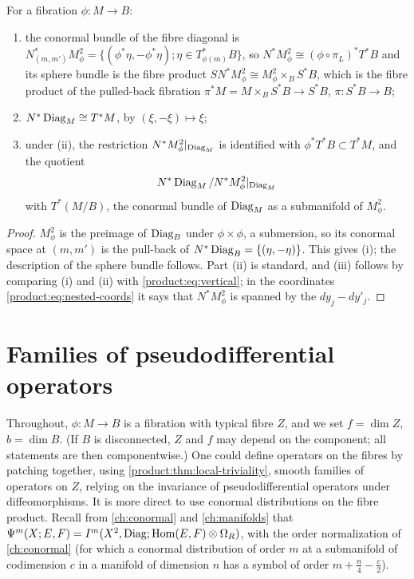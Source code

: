 \begin{lemma}\label{product:lem:conormal-identifications}
For a fibration $\phi:M\longrightarrow B$:
\begin{enumerate}[label=\textup{(\roman*)}]
\item the conormal bundle of the fibre diagonal is
$N^*_{(m,m')}M^2_\phi=\{(\phi^*\eta,-\phi^*\eta);\eta\in T^*_{\phi(m)}B\}$, so
$N^*M^2_\phi\cong(\phi\circ\pi_L)^*T^*B$ and its sphere bundle is the fibre
product $SN^*M^2_\phi\cong M^2_\phi\times_BS^*B$, which is the fibre product
of the pulled-back fibration $\pi^*M=M\times_BS^*B\longrightarrow S^*B$,
$\pi:S^*B\longrightarrow B$;
\item $N^*\operatorname{Diag}_M\cong T^*M$, by $(\xi,-\xi)\longmapsto\xi$;
\item under \textup{(ii)}, the restriction $N^*M^2_\phi|_{\operatorname{Diag}_M}$ is
identified with $\phi^*T^*B\subset T^*M$, and the quotient
\begin{equation*}
N^*\operatorname{Diag}_M/N^*M^2_\phi|_{\operatorname{Diag}_M}
\end{equation*}
with $T^*(M/B)$, the conormal bundle of $\operatorname{Diag}_M$ as a submanifold of
$M^2_\phi$.
\end{enumerate}
\end{lemma}

\begin{proof}
$M^2_\phi$ is the preimage of $\operatorname{Diag}_B$ under $\phi\times\phi$, a submersion, so
its conormal space at $(m,m')$ is the pull-back of $N^*\operatorname{Diag}_B=\{(\eta,-\eta)\}$.
This gives (i); the description of the sphere bundle follows. Part (ii) is
standard, and (iii) follows by comparing (i) and (ii) with
\eqref{product:eq:vertical}; in the coordinates \eqref{product:eq:nested-coords}
it says that $N^*M^2_\phi$ is spanned by the $dy_j-dy'_j$.
\end{proof}

\section{Families of pseudodifferential operators}\label{product:sec:families}

Throughout, $\phi:M\longrightarrow B$ is a fibration with typical fibre $Z$, and
we set $f=\dim Z$, $b=\dim B$. (If $B$ is disconnected, $Z$ and $f$ may depend on
the component; all statements are then componentwise.) One could define operators on the fibres by
patching together, using \cref{product:thm:local-triviality}, smooth families of
operators on $Z$, relying on the invariance of pseudodifferential operators under
diffeomorphisms. It is more direct to use conormal distributions on the fibre
product. Recall from \cref{ch:conormal} and \cref{ch:manifolds} that
$\Psi^{m}(X;E,F)=I^{m}(X^2,\operatorname{Diag};\operatorname{Hom}(E,F)\otimes\Omega_R)$, with the order
normalization of \cref{ch:conormal} (for which a conormal distribution of order
$m$ at a submanifold of codimension $c$ in a manifold of dimension $n$ has a
symbol of order $m+\frac n4-\frac c2$).

